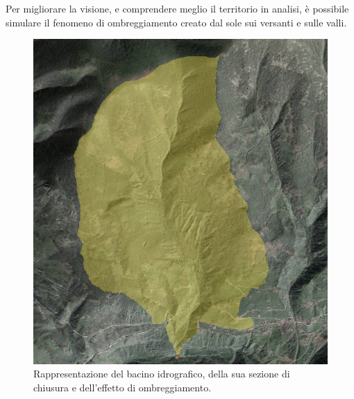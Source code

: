 \noindent Per migliorare la visione, e comprendere meglio il territorio in analisi, è possibile simulare il fenomeno di ombreggiamento creato dal sole sui versanti e sulle valli.
\begin{figure}[H]\centering
    \includegraphics[scale=.50]{immagini/bacino_ombreggiatura_qgis.PNG}
    \caption{Rappresentazione del bacino idrografico, della sua sezione di chiusura e dell'effetto di ombreggiamento.}
    \label{bacino_ombreggiatura_qgis}
\end{figure}


